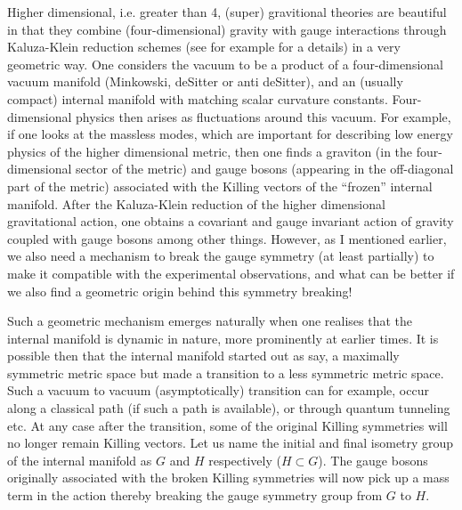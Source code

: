 \documentclass[a4paper,12pt]{article}
\begin{document}
Higher dimensional, i.e. greater than 4, (super) gravitional theories are beautiful in that they combine (four-dimensional) gravity with gauge interactions through Kaluza-Klein reduction  schemes (see for example \cite{kaluza,duff} for a details) in a very geometric way. One considers the vacuum to be a product of a four-dimensional vacuum manifold (Minkowski, deSitter or anti deSitter), and an (usually compact) internal manifold with matching scalar curvature constants. Four-dimensional physics then arises as fluctuations around this vacuum. For example, if one looks at the massless modes, which are  important for describing low energy physics of the higher dimensional metric, then one finds a  graviton (in the four-dimensional sector of the metric) and  gauge bosons (appearing in the off-diagonal part of the metric) associated with the Killing vectors of the ``frozen'' internal manifold. After the Kaluza-Klein reduction of the higher dimensional gravitational action, one obtains a covariant and gauge invariant action of gravity coupled with gauge bosons among other things. However, as I mentioned earlier, we also need a mechanism to break the gauge symmetry (at least partially) to make it compatible with the experimental observations, and what can be better if we also find a geometric origin behind this symmetry breaking! 

Such a geometric mechanism emerges naturally when one realises that the internal manifold is dynamic in nature, more prominently at earlier times. It is possible then that the internal manifold started out as say, a maximally symmetric metric space but made a transition to a less symmetric metric space.  Such a vacuum to vacuum (asymptotically) transition can for example, occur along a classical path (if such a path is available), or through quantum tunneling etc. At any case after the transition, some of the original Killing symmetries will no longer remain Killing vectors. Let us name the initial and final isometry group of the internal manifold as $G$ and $H$ respectively ($H \subset G$). The gauge bosons originally associated with the broken Killing symmetries will now pick up a mass term in the action thereby breaking the gauge symmetry group from $G$ to $H$. 
\end{document}
